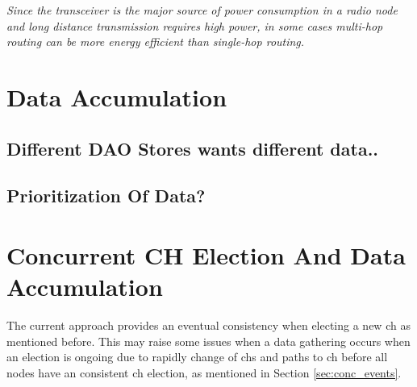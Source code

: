\documentclass[USenglish]{uit-thesis}
\begin{document}
\textit{Since the transceiver is the major source of power consumption in a radio node and long distance transmission requires high power, in some cases multi-hop routing can be more energy efficient than single-hop routing.}




\section{Data Accumulation}




\subsection{Different DAO Stores wants different data..}
\subsection{Prioritization Of Data?}

\section{Concurrent CH Election And Data Accumulation} \label{disc:simult_el_acc}
The current approach provides an eventual consistency when electing a new \gls{ch} as mentioned before. This may raise some issues when a data gathering occurs when an election is ongoing due to rapidly change of \gls{ch}s and paths to \gls{ch} before all nodes have an consistent \gls{ch} election, as mentioned in Section \ref{sec:conc_events}.
\end{document}
